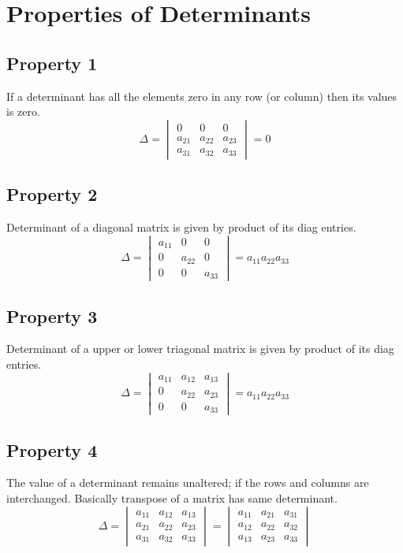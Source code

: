 \documentclass{article}
\begin{document}
\section{Properties of Determinants}
\subsection*{Property 1}
If a determinant has all the elements zero in any row (or column) then its values is zero.
\begin{equation*}
    \Delta=
    \begin{vmatrix}
        0 & 0 & 0 \\
        a_{21} & a_{22} & a_{23} \\
        a_{31} & a_{32} & a_{33} 
    \end{vmatrix}
    =0
\end{equation*}

\subsection*{Property 2}
Determinant of a diagonal matrix is given by product of its diag entries.
\begin{equation*}
    \Delta=
    \begin{vmatrix}
        a_{11} & 0 & 0 \\
        0 & a_{22} & 0 \\
        0 & 0 & a_{33} 
    \end{vmatrix}
    =a_{11}a_{22}a_{33}
\end{equation*}
\subsection*{Property 3}
Determinant of a upper or lower triagonal matrix is given by product of its diag entries.
\begin{equation*}
    \Delta=
    \begin{vmatrix}
        a_{11} & a_{12} & a_{13} \\
        0 & a_{22} & a_{23} \\
        0 & 0 & a_{33} 
    \end{vmatrix}
    =a_{11}a_{22}a_{33}
\end{equation*}
\subsection*{Property 4}
The value of a determinant remains unaltered; if the
rows and columns are interchanged. Basically transpose of a matrix has same determinant.
\begin{equation*}
    \Delta=
    \begin{vmatrix}
        a_{11} & a_{12} & a_{13} \\
        a_{21} & a_{22} & a_{23} \\
        a_{31} & a_{32} & a_{33} 
    \end{vmatrix}
    =
    \begin{vmatrix}
        a_{11} & a_{21} & a_{31} \\
        a_{12} & a_{22} & a_{32} \\
        a_{13} & a_{23} & a_{33} 
    \end{vmatrix}
\end{equation*}
\end{document}
